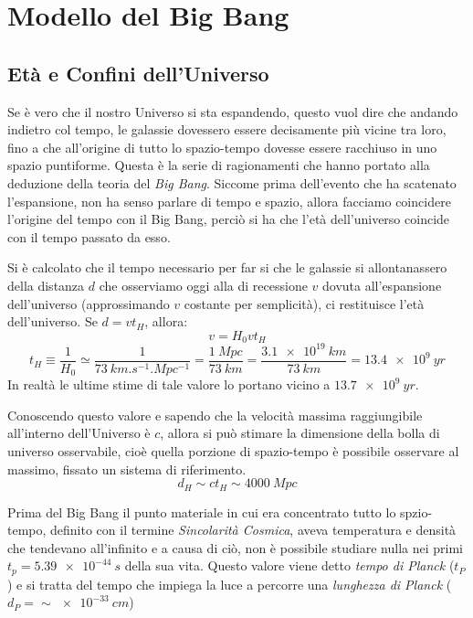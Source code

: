 \section{Modello del Big Bang}\label{sec:big-bang}
\subsection{Età e Confini dell'Universo}\label{sec:eta-confini-universo}

Se è vero che il nostro Universo si sta espandendo, questo vuol dire che andando indietro col tempo, le galassie dovessero essere decisamente più vicine tra loro, fino a che all'origine di tutto lo spazio-tempo dovesse essere racchiuso in uno spazio puntiforme. Questa è la serie di ragionamenti che hanno portato alla deduzione della teoria del \textit{Big Bang}. Siccome prima dell'evento che ha scatenato l'espansione, non ha senso parlare di tempo e spazio, allora facciamo coincidere l'origine del tempo con il Big Bang, perciò si ha che l'età dell'universo coincide con il tempo passato da esso.

Si è calcolato che il tempo necessario per far si che le galassie si allontanassero della distanza $d$ che osserviamo oggi alla di recessione $v$ dovuta all'espansione dell'universo (approssimando $v$ costante per semplicità), ci restituisce l'età dell'universo. Se $d = v t_H$, allora:
\[
    v = H_0 v t_H
\]
\begin{equation} \label{eq:eta-universo}
    t_H \equiv \frac{1}{H_0} \simeq \frac{1}{\SI{73}{km.s^{-1}.Mpc^{-1}}} = \frac{\SI{1}{Mpc}}{\SI{73}{km}} = \frac{\SI{3.1e19}{km}}{\SI{73}{km}} = \SI{13.4e9}{yr}
\end{equation}
In realtà le ultime stime di tale valore lo portano vicino a $\SI{13.7e9}{yr}$.

Conoscendo questo valore e sapendo che la velocità massima raggiungibile all'interno dell'Universo è $c$, allora si può stimare la dimensione della bolla di universo osservabile, cioè quella porzione di spazio-tempo è possibile osservare al massimo, fissato un sistema di riferimento.
\[
    d_H \sim c t_H \sim \SI{4000}{Mpc}
\]

Prima del Big Bang il punto materiale in cui era concentrato tutto lo spzio-tempo, definito con il termine \textit{Sincolarità Cosmica}, aveva temperatura e densità che tendevano all'infinito e a causa di ciò, non è possibile studiare nulla nei primi $t_p = \SI{5.39e-44}{s}$ della sua vita. Questo valore viene detto \textit{tempo di Planck} ($t_P$) e si tratta del tempo che impiega la luce a percorre una \textit{lunghezza di Planck} ($d_P = \sim \SI{e-33}{cm}$)


